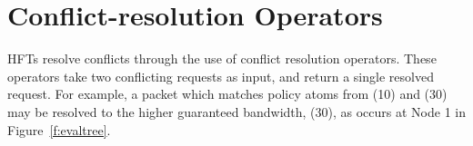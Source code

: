\section{Conflict-resolution Operators}
\label{sec:conflict-resolution-operators}

%
%
%



HFTs resolve conflicts through the use of conflict resolution operators.
These operators take two conflicting requests as input, and return a single
resolved request. For example, a packet which matches policy atoms from (10)
and (30) may be resolved to the higher guaranteed bandwidth,
(30), as occurs at Node 1 in Figure~\ref{f:evaltree}.


